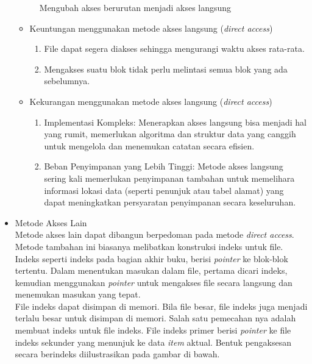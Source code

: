 \documentclass[12pt]{article}
\begin{document}
\begin{itemize}
\begin{figure}[h]
            \caption{Mengubah akses berurutan menjadi akses langsung}
        \end{figure}
        \begin{itemize}
            \item Keuntungan menggunakan metode akses langsung (\textit{direct access})
            \begin{enumerate}
                \item File dapat segera diakses sehingga mengurangi waktu akses rata-rata.
                \item Mengakses suatu blok tidak perlu melintasi semua blok yang ada sebelumnya.
            \end{enumerate}
            \item Kekurangan menggunakan metode akses langsung (\textit{direct access})
            \begin{enumerate}
                \item Implementasi Kompleks: Menerapkan akses langsung bisa menjadi hal yang rumit, memerlukan algoritma dan struktur data yang canggih untuk mengelola dan menemukan catatan secara efisien.
                \item Beban Penyimpanan yang Lebih Tinggi: Metode akses langsung sering kali memerlukan penyimpanan tambahan untuk memelihara informasi lokasi data (seperti penunjuk atau tabel alamat) yang dapat meningkatkan persyaratan penyimpanan secara keseluruhan.
            \end{enumerate}
        \end{itemize}
    \item  Metode Akses Lain
        \\Metode akses lain dapat dibangun berpedoman pada metode \textit{direct access}. Metode tambahan ini biasanya melibatkan konstruksi indeks untuk file. Indeks seperti indeks pada bagian akhir buku, berisi \textit{pointer} ke blok-blok tertentu. Dalam menentukan masukan dalam file, pertama dicari indeks, kemudian menggunakan \textit{pointer} untuk mengakses file secara langsung dan menemukan masukan yang tepat.
        \\File indeks dapat disimpan di memori. Bila file besar, file indeks juga menjadi terlalu besar untuk disimpan di memori. Salah satu pemecahan nya adalah membuat indeks untuk file indeks. File indeks primer berisi \textit{pointer} ke file indeks sekunder yang menunjuk ke data \textit{item} aktual. Bentuk pengaksesan secara berindeks diilustrasikan pada gambar di bawah.
        \begin{figure}[h]

\end{figure}
\end{itemize}
\end{document}
